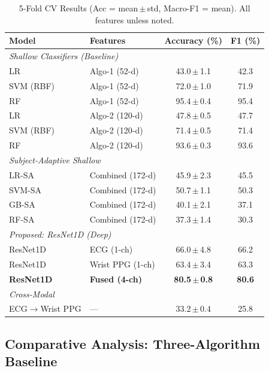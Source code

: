\documentclass[conference]{IEEEtran}
\begin{document}
\begin{table}[ht]
\centering
\caption{5-Fold CV Results (Acc = mean\,$\pm$\,std, Macro-F1 = mean). All features unless noted.}
\label{tab:main}
\setlength{\tabcolsep}{4pt}
\begin{tabular}{llcc}
\toprule
\textbf{Model} & \textbf{Features} & \textbf{Accuracy (\%)} & \textbf{F1 (\%)} \\
\midrule
\multicolumn{4}{l}{\textit{Shallow Classifiers (Baseline)}} \\
LR              & Algo-1 (52-d)    & 43.0\,$\pm$\,1.1 & 42.3 \\
SVM (RBF)       & Algo-1 (52-d)    & 72.0\,$\pm$\,1.0 & 71.9 \\
RF              & Algo-1 (52-d)    & 95.4\,$\pm$\,0.4 & 95.4 \\
LR              & Algo-2 (120-d)   & 47.8\,$\pm$\,0.5 & 47.7 \\
SVM (RBF)       & Algo-2 (120-d)   & 71.4\,$\pm$\,0.5 & 71.4 \\
RF              & Algo-2 (120-d)   & 93.6\,$\pm$\,0.3 & 93.6 \\
\midrule
\multicolumn{4}{l}{\textit{Subject-Adaptive Shallow}} \\
LR-SA           & Combined (172-d) & 45.9\,$\pm$\,2.3 & 45.5 \\
SVM-SA          & Combined (172-d) & 50.7\,$\pm$\,1.1 & 50.3 \\
GB-SA           & Combined (172-d) & 40.1\,$\pm$\,2.1 & 37.1 \\
RF-SA           & Combined (172-d) & 37.3\,$\pm$\,1.4 & 30.3 \\
\midrule
\multicolumn{4}{l}{\textit{Proposed: ResNet1D (Deep)}} \\
ResNet1D        & ECG (1-ch)        & 66.0\,$\pm$\,4.8 & 66.2 \\
ResNet1D        & Wrist PPG (1-ch) & 63.4\,$\pm$\,3.4 & 63.3 \\
\textbf{ResNet1D} & \textbf{Fused (4-ch)} & \textbf{80.5\,$\pm$\,0.8} & \textbf{80.6} \\
\midrule
\multicolumn{4}{l}{\textit{Cross-Modal}} \\
ECG$\to$Wrist PPG & — & 33.2\,$\pm$\,0.4 & 25.8 \\
\bottomrule
\end{tabular}
\end{table}

\subsection{Comparative Analysis: Three-Algorithm Baseline}
\end{document}
